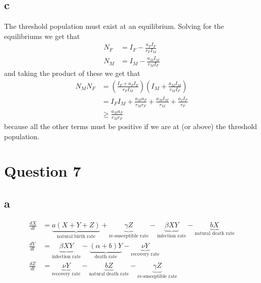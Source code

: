 \documentclass{unswmaths}
\begin{document}
\subsection*{c}
The threshold population must exist at an equilibrium. Solving for the equilibriums we get that
\begin{align*}
    N_F &= I_F - \frac{a_FI_F}{r_FI_M} \\
    N_M &= I_M - \frac{a_MI_M}{r_MI_F}
\end{align*}
and taking the product of these we get that
\begin{align*}
    N_MN_F &= \left( \frac{I_F + a_FI_F}{r_FI_M} \right) \left( I_M + \frac{a_MI_M}{r_MI_F} \right) \\
        &= I_FI_M + \frac{a_Ma_F}{r_Mr_F} + \frac{a_MI_M}{r_M} + \frac{a_fI_F}{r_F} \\
        &\geq  \frac{a_Ma_F}{r_Mr_F} 
\end{align*}
because all the other terms must be positive if we are at (or above) the threshold population.
\section*{Question 7}
\subsection*{a}
\begin{align*}
    \frac{dX}{dt} &= \underbrace{a(X+Y+Z)}_{\text{natural birth rate}} + \underbrace{\gamma Z}_{\text{re-susceptible rate}} - \underbrace{\beta XY}_{\text{infection rate}} - \underbrace{bX}_{\text{natural death rate}} \\
    \frac{dY}{dt} &= \underbrace{\beta XY}_{\text{infection rate}} - \underbrace{(\alpha + b)Y}_{\text{death rate}} - \underbrace{\nu Y}_{\text{recovery rate}} \\
    \frac{dZ}{dt} &= \underbrace{\nu Y}_{\text{recovery rate}} - \underbrace{bZ}_{\text{natural death rate}} - \underbrace{\gamma Z}_{\text{re-susceptible rate}}
\end{align*}
\end{document}
